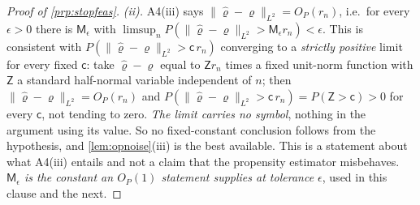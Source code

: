 \begin{proof}[Proof of \cref{prp:stopfeas}]
\emph{(ii).} A4(iii) says $\|\hat\varrho-\varrho\|_{L^{2}}=O_P(r_n)$, i.e.\ for every $\epsilon>0$ there
is $\mathsf M_\epsilon$ with $\limsup_nP(\|\hat\varrho-\varrho\|_{L^{2}}>\mathsf M_\epsilon r_n)<\epsilon$.
This is consistent with $P(\|\hat\varrho-\varrho\|_{L^{2}}>\mathsf c\,r_n)$ converging to a
\emph{strictly positive} limit for every fixed $\mathsf c$: take $\hat\varrho-\varrho$ equal to
$\mathsf Z r_n$ times a fixed unit-norm function with
$\mathsf Z$ a standard half-normal variable independent of $n$; then $\|\hat\varrho-\varrho\|_{L^2}=O_P(r_n)$
and $P(\|\hat\varrho-\varrho\|_{L^{2}}>\mathsf c\,r_n)=P(\mathsf Z>\mathsf c)>0$ for every $\mathsf c$,
not tending to
zero. \emph{The limit carries no symbol}, nothing in the argument using its value. So no fixed-constant
conclusion follows from the hypothesis, and \cref{lem:opnoise}(iii) is the
best available. This is a statement about what A4(iii) entails and not a claim that the
propensity estimator misbehaves. \emph{$\mathsf M_\epsilon$ is the constant an $O_P(1)$ statement
supplies at tolerance $\epsilon$}, used in this clause and the next.


\end{proof}
